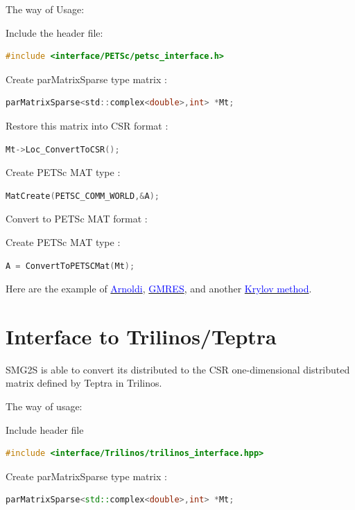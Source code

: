 \documentclass[a4paper, 10 pt]{report}
\begin{document}
	The way of Usage:
	
	Include the header file:
   \begin{lstlisting}[language=C,frame=single]
   #include <interface/PETSc/petsc_interface.h>
   \end{lstlisting}
	
	Create parMatrixSparse type matrix :
   \begin{lstlisting}[language=C,frame=single]
  parMatrixSparse<std::complex<double>,int> *Mt;
   \end{lstlisting}

	Restore this matrix into CSR format :
   \begin{lstlisting}[language=C,frame=single]
   Mt->Loc_ConvertToCSR();
	\end{lstlisting}

	Create PETSc MAT type :
   \begin{lstlisting}[language=C,frame=single]
   MatCreate(PETSC_COMM_WORLD,&A); 
	\end{lstlisting}

   Convert to PETSc MAT format :

	Create PETSc MAT type :
   \begin{lstlisting}[language=C,frame=single]
   A = ConvertToPETSCMat(Mt); 
   \end{lstlisting}

    Here are the example of \href{https://github.com/SMG2S/SMG2S/tree/master/example/arnoldi}{\textcolor{blue}{Arnoldi}}, \href{https://github.com/SMG2S/SMG2S/tree/master/example/gmres}{\textcolor{blue}{GMRES}}, and another  \href{https://github.com/SMG2S/SMG2S/tree/master/example/krylov}{\textcolor{blue}{Krylov method}}.
    
	\section{Interface to Trilinos/Teptra}
	
	SMG2S is able to convert its distributed to the CSR one-dimensional distributed matrix defined by Teptra in Trilinos.
	
	The way of usage:
	
	 Include header file

	\begin{lstlisting}[language=C++,frame=single]
   #include <interface/Trilinos/trilinos_interface.hpp>
	\end{lstlisting}
	
	Create parMatrixSparse type matrix :
	\begin{lstlisting}[language=C++,frame=single]
   parMatrixSparse<std::complex<double>,int> *Mt;
   \end{lstlisting}
	
\end{document}
